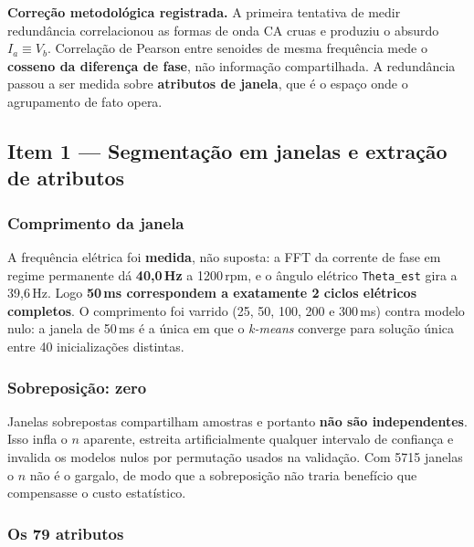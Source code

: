 \documentclass[12pt,a4paper]{article}
\begin{document}
\textbf{Correção metodológica registrada.} A primeira tentativa de medir redundância correlacionou as formas de onda CA cruas e produziu o absurdo $I_a \equiv V_b$. Correlação de Pearson entre senoides de mesma frequência mede o \textbf{cosseno da diferença de fase}, não informação compartilhada. A redundância passou a ser medida sobre \textbf{atributos de janela}, que é o espaço onde o agrupamento de fato opera.

\subsection{Item 1 --- Segmentação em janelas e extração de atributos}

\subsubsection*{Comprimento da janela}

A frequência elétrica foi \textbf{medida}, não suposta: a FFT da corrente de fase em regime permanente dá \textbf{40,0\,Hz} a 1200\,rpm, e o ângulo elétrico \texttt{Theta\_est} gira a 39,6\,Hz. Logo \textbf{50\,ms correspondem a exatamente 2 ciclos elétricos completos}. O comprimento foi varrido (25, 50, 100, 200 e 300\,ms) contra modelo nulo: a janela de 50\,ms é a única em que o \emph{k-means} converge para solução única entre 40 inicializações distintas.

\subsubsection*{Sobreposição: zero}

Janelas sobrepostas compartilham amostras e portanto \textbf{não são independentes}. Isso infla o $n$ aparente, estreita artificialmente qualquer intervalo de confiança e invalida os modelos nulos por permutação usados na validação. Com 5715 janelas o $n$ não é o gargalo, de modo que a sobreposição não traria benefício que compensasse o custo estatístico.

\subsubsection*{Os 79 atributos}
\end{document}
